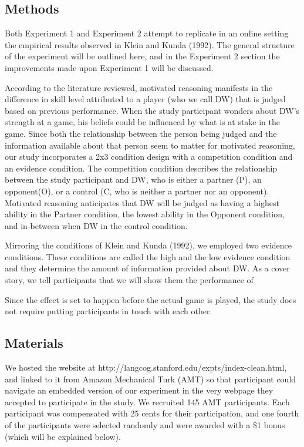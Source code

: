 \documentclass{article}
\begin{document}
\subsection{Methods}

Both Experiment 1 and Experiment 2 attempt to replicate in an online setting the empirical results observed in Klein and Kunda (1992). The general structure of the experiment will be outlined here, and in the Experiment 2 section the improvements made upon Experiment 1 will be discussed.

According to the literature reviewed, motivated reasoning manifests in the difference in skill level attributed to a player (who we call DW) that is judged based on previous performance. When the study participant wonders about DW's strength at a game, his beliefs could be influenced by what is at stake in the game. Since both the relationship between the person being judged and the information available about that person seem to matter for motivated reasoning, our study incorporates a 2x3 condition design with a competition condition and an evidence condition. The competition condition describes the relationship between the study participant and DW, who is either a partner (P), an opponent(O), or a control (C, who is neither a partner nor an opponent). Motivated reasoning anticipates that DW will be judged as having a highest ability in the Partner condition, the lowest ability in the Opponent condition, and in-between when DW in the control condition. 

Mirroring the conditions of Klein and Kunda (1992), we employed two evidence conditions. These conditions are called the high and the low evidence condition and they determine the amount of information provided about DW. As a cover story, we tell participants that we will show them the performance of

Since the effect is set to happen before the actual game is played, the study does not require putting participants in touch with each other.

\subsection{Materials}

We hosted the website at http://langcog.stanford.edu/expts/index-clean.html, and linked to it from Amazon Mechanical Turk (AMT) so that participant could navigate an embedded version of our experiment in the very webpage they accepted to participate in the study. We recruited 145 AMT participants. Each participant was compensated with 25 cents for their participation, and one fourth of the participants were selected randomly and were awarded with a \$1 bonus (which will be explained below).
\end{document}

